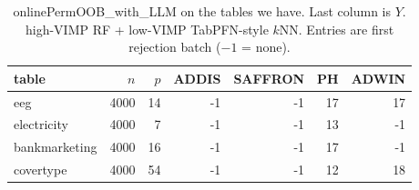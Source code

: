 \begin{table}[ht]
\centering
\caption{onlinePermOOB\_with\_LLM on the tables we have. Last column is $Y$. high-VIMP RF + low-VIMP TabPFN-style $k$NN. Entries are first rejection batch ($-1$ = none).}
\label{tab:data}
\begin{tabular}{lrrrrrr}
\toprule
table & $n$ & $p$ & ADDIS & SAFFRON & PH & ADWIN \\
\midrule
eeg & 4000 & 14 & -1 & -1 & 17 & 17 \\
electricity & 4000 & 7 & -1 & -1 & 13 & -1 \\
bankmarketing & 4000 & 16 & -1 & -1 & 17 & -1 \\
covertype & 4000 & 54 & -1 & -1 & 12 & 18 \\
\bottomrule
\end{tabular}
\end{table}
